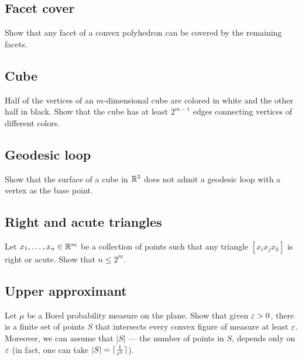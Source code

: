 \subsection*{Facet cover}\label{Facet cover}

\begin{pr}
Show that any facet of a convex polyhedron can be covered by the remaining facets.
\end{pr}


\subsection*{Cube}\label{Cube}

\begin{pr}
Half of the vertices 
of an $m$-dimensional cube
are colored in white and the other half in black.
Show that the cube has at least $2^{m-1}$ edges connecting vertices of different colors. 
\end{pr}

\subsection*{Geodesic loop}\label{Geodesic loop}

\begin{pr}
Show that the surface of a cube in $\mathbb{R}^3$
does not admit a geodesic loop with a vertex as the base point.
\end{pr}

\subsection*{Right and acute triangles}\label{Right and acute triangles}

\begin{pr}
Let $x_1,\dots,x_n\in\mathbb{R}^m$
be a collection of points such that any triangle $[x_ix_jx_k]$ is right or acute.
Show that $n\le 2^m$.
\end{pr}

\subsection*{Upper approximant}\label{One-sided approximants}

\begin{pr}
Let $\mu$ be a Borel probability measure on the plane.
Show that given $\varepsilon>0$, there is a finite set of points $S$ that intersects every convex figure of measure at least $\varepsilon$.
Moreover, we can assume that $|S|$ --- the number of points in $S$, depends only on $\varepsilon$ (in fact, one can take $|S|=\lceil\tfrac1{\varepsilon^5}\rceil$).
\end{pr}

